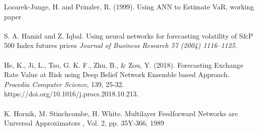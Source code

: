 \documentclass[a4paper,11pt,oneside]{book}
\begin{document}
Locarek-Junge, H. and Prinzler, R. (1999). Using ANN to Estimate VaR, working
paper.\\\\
S. A. Hamid and Z. Iqbal. Using neural networks for forecasting volatility of S\&P 500 Index futures prices \textit{Journal of Business Research 57 (2004) 1116–1125}.\\\\
He, K., Ji, L., Tso, G. K. F., Zhu, B., \& Zou, Y. (2018). Forecasting Exchange Rate Value at Risk using Deep Belief Network Ensemble based Approach. \textit{Procedia Computer Science}, 139, 25-32.
https://doi.org/10.1016/j.procs.2018.10.213.\\\\
K. Hornik, M. Stinchcombe, H. White. Multilayer Feedforward Networks are Universal Approximators , Vol. 2, pp. 35Y-366, 1989





\listoffigures
\listoftables


\end{document}
